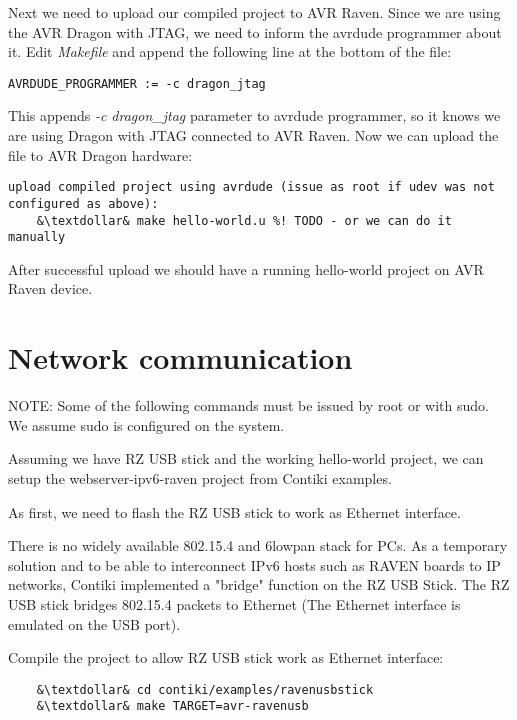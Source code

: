 \documentclass{article}
\begin{document}
Next we need to upload our compiled project to AVR Raven.
Since we are using the AVR Dragon with JTAG, we need to inform the avrdude programmer about it.
Edit {\it{Makefile}} and append the following line at the bottom of the file:
\begin{lstlisting}
AVRDUDE_PROGRAMMER := -c dragon_jtag
\end{lstlisting}

This appends {\it{-c dragon\_jtag}} parameter to avrdude programmer, so it knows we are using Dragon with JTAG connected to AVR Raven.
Now we can upload the file to AVR Dragon hardware:
\begin{lstlisting}
upload compiled project using avrdude (issue as root if udev was not configured as above):
	&\textdollar& make hello-world.u %! TODO - or we can do it manually
\end{lstlisting}
After successful upload we should have a running hello-world project on AVR Raven device.


\section{Network communication}
NOTE: Some of the following commands must be issued by root or with sudo. We assume sudo is configured on the system.

Assuming we have RZ USB stick and the working hello-world project,
we can setup the webserver-ipv6-raven project from Contiki examples.

As first, we need to flash the RZ USB stick to work as Ethernet interface.

There is no widely available 802.15.4 and 6lowpan stack for PCs.
As a temporary solution and to be able to interconnect IPv6 hosts such as RAVEN boards to IP networks,
Contiki implemented a "bridge" function on the RZ USB Stick.
The RZ USB stick bridges 802.15.4 packets to Ethernet (The Ethernet interface is emulated on the USB port).


Compile the project to allow RZ USB stick work as Ethernet interface:
\begin{lstlisting}
	&\textdollar& cd contiki/examples/ravenusbstick
	&\textdollar& make TARGET=avr-ravenusb
\end{lstlisting}
\end{document}
